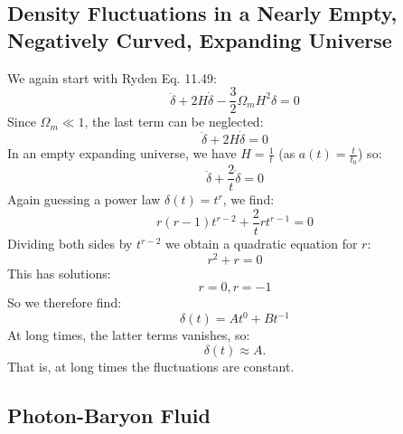 \subsection{Density Fluctuations in a Nearly Empty, Negatively Curved, Expanding Universe}
We again start with Ryden Eq. 11.49:
\begin{equation}
    \ddot{\delta} + 2H\dot{\delta} - \frac{3}{2}\Omega_m H^2\delta = 0
\end{equation}
Since $\Omega_m \ll 1$, the last term can be neglected:
\begin{equation}
    \ddot{\delta} + 2H\dot{\delta} = 0
\end{equation}
In an empty expanding universe, we have $H = \frac{1}{t}$ (as $a(t) = \frac{t}{t_0}$) so:
\begin{equation}
    \ddot{\delta} + \frac{2}{t}\dot{\delta} = 0
\end{equation}
Again guessing a power law $\delta(t) = t^r$, we find:
\begin{equation}
    r(r-1)t^{r-2} + \frac{2}{t}rt^{r-1} = 0
\end{equation}
Dividing both sides by $t^{r-2}$ we obtain a quadratic equation for $r$:
\begin{equation}
    r^2 + r = 0
\end{equation}
This has solutions:
\begin{equation}
    r = 0, r = -1
\end{equation}
So we therefore find:
\begin{equation}
    \boxed{\delta(t) = At^0 + Bt^{-1}}
\end{equation}
At long times, the latter terms vanishes, so:
\begin{equation}
    \boxed{\delta(t) \approx A}.
\end{equation}
That is, at long times the fluctuations are constant.

\subsection{Photon-Baryon Fluid}
\subsection{}
\subsection{}
\subsection{}